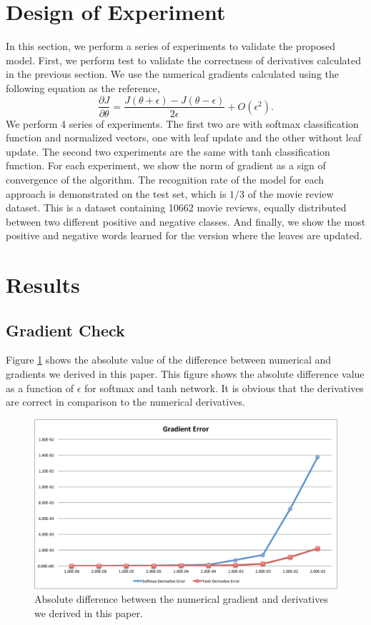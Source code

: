 \documentclass[twoside,12pt]{article}
\begin{document}
\section{Design of Experiment}
In this section, we perform a series of experiments to validate the proposed model. First, we perform test to validate the correctness of derivatives calculated in the previous section. We use the numerical gradients calculated using the following equation as the reference,
\begin{equation}
\frac{\partial J}{\partial \theta}=\frac{J(\theta+\epsilon)-J(\theta-\epsilon)}{2\epsilon}+O(\epsilon^2).
\end{equation}
We perform 4 series of experiments. The first two are with softmax classification function and normalized vectors, one with leaf update and the other without leaf update. The second two experiments are the same with tanh classification function. For each experiment, we show the norm of gradient as a sign of convergence of the algorithm. The recognition rate of the model for each approach is demonstrated on the test set, which is $1/3$ of the movie review dataset. This is a dataset containing 10662 movie reviews, equally distributed between two different positive and negative classes. And finally, we show the most positive and negative words learned for the version where the leaves are updated.

\section{Results}
\subsection{Gradient Check}
Figure \ref{figGradCheck} shows the absolute value of the difference between numerical and gradients we derived in this paper. This figure shows the absolute difference value as a function of $\epsilon$ for softmax and tanh network. It is obvious that the derivatives are correct in comparison to the numerical derivatives.

\begin{figure}[ht!]
\centering
\includegraphics[width=1.\textwidth]{gradError.pdf}
\caption{Absolute difference between the numerical gradient and derivatives we derived in this paper.}
\label{figGradCheck}
\end{figure}
\end{document}
